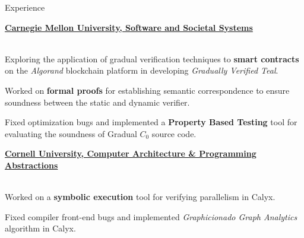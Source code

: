 \begin{rSection}{Experience}
	{\textbf{\large{\href{https://github.com/gradual-verification/gvc0}{Carnegie Mellon University, Software and Societal Systems \ExternalLink}}} \hfill \color{darkgray}{06/2022 - Present} 
	\\ \vspace*{1mm}
	 \hfill \color{darkgray}{Pittsburgh, PA} 
	\\ 
	\color{black}
	\begin{minipage}{40em}
		\color{black}Exploring the application of gradual verification techniques to \textbf{smart contracts} on the \textit{Algorand} blockchain platform in developing \textit{Gradually Verified Teal}.

		\color{black}Worked on \textbf{formal proofs} for establishing semantic correspondence to ensure soundness between the static and dynamic verifier.

		\color{black}Fixed optimization bugs and implemented a \textbf{Property Based Testing} tool for evaluating the soundness of Gradual $C_0$ source code.
	\end{minipage}}

	{\textbf{\large{\href{https://github.com/cucapra/calyx}{Cornell University, Computer Architecture \& Programming Abstractions \ExternalLink}}} \hfill \color{darkgray}{10/2021 - 12/2022} 
	\\ \vspace*{1mm}
	 \hfill \color{darkgray}{Ithaca, NY}
	\\
	\color{black}
	\begin{minipage}{40em}
		\color{black} Worked on a \textbf{symbolic execution} tool for verifying parallelism in Calyx.

		\color{black} Fixed compiler front-end bugs and implemented \textit{Graphicionado Graph Analytics} algorithm in Calyx.
	\end{minipage}} 

\end{rSection} 
